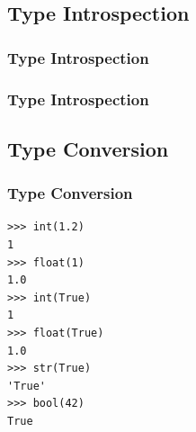 {\subsection{Type Introspection}
\begin{frame}
    \frametitle{Type Introspection}
    \vspace{0mm}
    \contentTypeIntrospectionI
\end{frame}
\begin{frame}
    \frametitle{Type Introspection}
    \vspace{0mm}
    \contentTypeIntrospectionII
\end{frame}

\subsection{Type Conversion}
\begin{frame}[fragile]
  \frametitle{Type Conversion}
  \vspace{0mm}
  \begin{verbatim}
>>> int(1.2)
1
>>> float(1)
1.0
>>> int(True)
1
>>> float(True)
1.0
>>> str(True)
'True'
>>> bool(42)
True
  \end{verbatim}
\end{frame}

}


